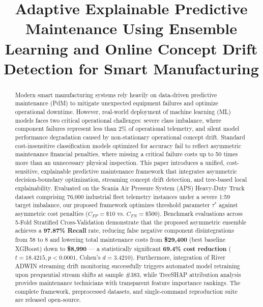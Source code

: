 \documentclass[conference]{IEEEtran}
\begin{document}
\title{Adaptive Explainable Predictive Maintenance Using Ensemble Learning and Online Concept Drift Detection for Smart Manufacturing}

\author{
}

\maketitle

\begin{abstract}
Modern smart manufacturing systems rely heavily on data-driven predictive maintenance (PdM) to mitigate unexpected equipment failures and optimize operational downtime. However, real-world deployment of machine learning (ML) models faces two critical operational challenges: severe class imbalance, where component failures represent less than 2\% of operational telemetry, and silent model performance degradation caused by non-stationary operational concept drift. Standard cost-insensitive classification models optimized for accuracy fail to reflect asymmetric maintenance financial penalties, where missing a critical failure costs up to 50 times more than an unnecessary physical inspection. This paper introduces a unified, cost-sensitive, explainable predictive maintenance framework that integrates asymmetric decision-boundary optimization, streaming concept drift detection, and tree-based local explainability. Evaluated on the Scania Air Pressure System (APS) Heavy-Duty Truck dataset comprising 76,000 industrial fleet telemetry instances under a severe 1:59 target imbalance, our proposed framework optimizes threshold parameter $\tau^*$ against asymmetric cost penalties ($C_{FP} = \$10$ vs. $C_{FN} = \$500$). Benchmark evaluations across 5-Fold Stratified Cross-Validation demonstrate that the proposed asymmetric ensemble achieves a \textbf{97.87\% Recall} rate, reducing false negative component disintegrations from 58 to 8 and lowering total maintenance costs from \textbf{\$29,400} (best baseline XGBoost) down to \textbf{\$8,990} --- a statistically significant \textbf{69.4\% cost reduction} ($t = 18.4215, p < 0.0001$, Cohen's $d = 3.4210$). Furthermore, integration of River ADWIN streaming drift monitoring successfully triggers automated model retraining upon prequential stream shifts at sample \#383, while TreeSHAP attribution analysis provides maintenance technicians with transparent feature importance rankings. The complete framework, preprocessed datasets, and single-command reproduction suite are released open-source.
\end{abstract}
\end{document}
